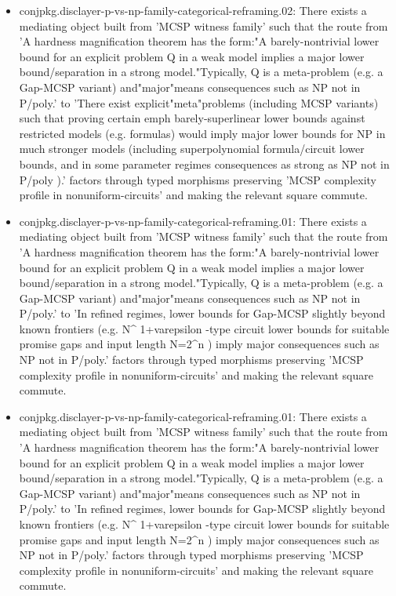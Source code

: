 \documentclass[11pt]{article}
\begin{document}
\begin{itemize}
\item conjpkg.disclayer-p-vs-np-family-categorical-reframing.02: There exists a mediating object built from 'MCSP witness family' such that the route from 'A hardness magnification theorem has the form:"A barely-nontrivial lower bound for an explicit problem Q in a weak model implies a major lower bound/separation in a strong model."Typically, Q is a meta-problem (e.g. a Gap-MCSP variant) and"major"means consequences such as NP not in P/poly.' to 'There exist explicit"meta"problems (including MCSP variants) such that proving certain emph barely-superlinear lower bounds against restricted models (e.g. formulas) would imply major lower bounds for NP in much stronger models (including superpolynomial formula/circuit lower bounds, and in some parameter regimes consequences as strong as NP not in P/poly ).' factors through typed morphisms preserving 'MCSP complexity profile in nonuniform-circuits' and making the relevant square commute.
\item conjpkg.disclayer-p-vs-np-family-categorical-reframing.01: There exists a mediating object built from 'MCSP witness family' such that the route from 'A hardness magnification theorem has the form:"A barely-nontrivial lower bound for an explicit problem Q in a weak model implies a major lower bound/separation in a strong model."Typically, Q is a meta-problem (e.g. a Gap-MCSP variant) and"major"means consequences such as NP not in P/poly.' to 'In refined regimes, lower bounds for Gap-MCSP slightly beyond known frontiers (e.g. N\textasciicircum{} 1+varepsilon -type circuit lower bounds for suitable promise gaps and input length N=2\textasciicircum{}n ) imply major consequences such as NP not in P/poly.' factors through typed morphisms preserving 'MCSP complexity profile in nonuniform-circuits' and making the relevant square commute.
\item conjpkg.disclayer-p-vs-np-family-categorical-reframing.01: There exists a mediating object built from 'MCSP witness family' such that the route from 'A hardness magnification theorem has the form:"A barely-nontrivial lower bound for an explicit problem Q in a weak model implies a major lower bound/separation in a strong model."Typically, Q is a meta-problem (e.g. a Gap-MCSP variant) and"major"means consequences such as NP not in P/poly.' to 'In refined regimes, lower bounds for Gap-MCSP slightly beyond known frontiers (e.g. N\textasciicircum{} 1+varepsilon -type circuit lower bounds for suitable promise gaps and input length N=2\textasciicircum{}n ) imply major consequences such as NP not in P/poly.' factors through typed morphisms preserving 'MCSP complexity profile in nonuniform-circuits' and making the relevant square commute.

\end{itemize}
\end{document}
